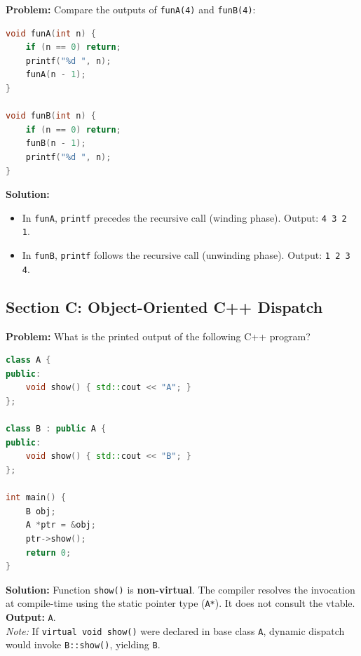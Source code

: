 \begin{tcolorbox}[colback=white,colframe=primary,title=\textbf{Question 7: Unwinding Print vs. Winding Print}]
\textbf{Problem:} Compare the outputs of \texttt{funA(4)} and \texttt{funB(4)}:
\begin{lstlisting}[language=C]
void funA(int n) {
    if (n == 0) return;
    printf("%d ", n);
    funA(n - 1);
}

void funB(int n) {
    if (n == 0) return;
    funB(n - 1);
    printf("%d ", n);
}
\end{lstlisting}
\textbf{Solution:}
\begin{itemize}[leftmargin=*]
    \item In \texttt{funA}, \texttt{printf} precedes the recursive call (winding phase). Output: \texttt{4 3 2 1}.
    \item In \texttt{funB}, \texttt{printf} follows the recursive call (unwinding phase). Output: \texttt{1 2 3 4}.
\end{itemize}
\end{tcolorbox}

\subsection{Section C: Object-Oriented C++ Dispatch}

\begin{tcolorbox}[colback=white,colframe=primary,title=\textbf{Question 8: Virtual vs. Non-Virtual Member Function Dispatch}]
\textbf{Problem:} What is the printed output of the following C++ program?
\begin{lstlisting}[language=C++]
class A {
public:
    void show() { std::cout << "A"; }
};

class B : public A {
public:
    void show() { std::cout << "B"; }
};

int main() {
    B obj;
    A *ptr = &obj;
    ptr->show();
    return 0;
}
\end{lstlisting}
\textbf{Solution:} Function \texttt{show()} is \textbf{non-virtual}. The compiler resolves the invocation at compile-time using the static pointer type (\texttt{A*}). It does not consult the vtable. \\
\textbf{Output:} \texttt{A}. \\
\textit{Note:} If \texttt{virtual void show()} were declared in base class \texttt{A}, dynamic dispatch would invoke \texttt{B::show()}, yielding \texttt{B}.
\end{tcolorbox}

